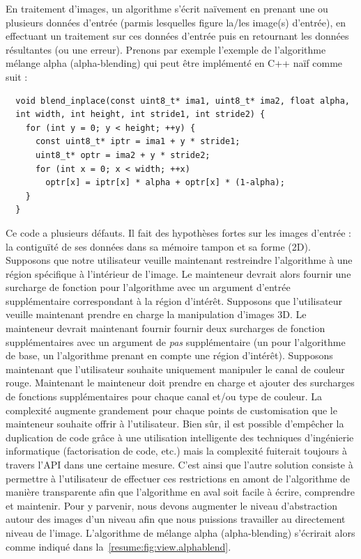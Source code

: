 En traitement d'images, un algorithme s'écrit naïvement en prenant une ou plusieurs données d'entrée (parmis lesquelles
figure la/les image(s) d'entrée), en effectuant un traitement sur ces données d'entrée puis en retournant les données
résultantes (ou une erreur). Prenons par exemple l'exemple de l'algorithme mélange alpha (alpha-blending) qui peut être
implémenté en C++ naïf comme suit :
\begin{verbatim}
  void blend_inplace(const uint8_t* ima1, uint8_t* ima2, float alpha,
  int width, int height, int stride1, int stride2) {
    for (int y = 0; y < height; ++y) {
      const uint8_t* iptr = ima1 + y * stride1;
      uint8_t* optr = ima2 + y * stride2;
      for (int x = 0; x < width; ++x)
        optr[x] = iptr[x] * alpha + optr[x] * (1-alpha);
    }
  }
\end{verbatim}

Ce code a plusieurs défauts. Il fait des hypothèses fortes sur les images d'entrée : la contiguïté de ses données dans
sa mémoire tampon et sa forme (2D). Supposons que notre utilisateur veuille maintenant restreindre l'algorithme à une
région spécifique à l'intérieur de l'image. Le mainteneur devrait alors fournir une surcharge de fonction pour
l'algorithme avec un argument d'entrée supplémentaire correspondant à la région d'intérêt. Supposons que l'utilisateur
veuille maintenant prendre en charge la manipulation d'images 3D. Le mainteneur devrait maintenant fournir fournir deux
surcharges de fonction supplémentaires avec un argument de \emph{pas} supplémentaire (un pour l'algorithme de base, un
l'algorithme prenant en compte une région d'intérêt). Supposons maintenant que l'utilisateur souhaite uniquement
manipuler le canal de couleur rouge. Maintenant le mainteneur doit prendre en charge et ajouter des surcharges de
fonctions supplémentaires pour chaque canal et/ou type de couleur. La complexité augmente grandement pour chaque points
de customisation que le mainteneur souhaite offrir à l'utilisateur. Bien sûr, il est possible d'empêcher la duplication
de code grâce à une utilisation intelligente des techniques d'ingénierie informatique (factorisation de code, etc.) mais
la complexité fuiterait toujours à travers l'API dans une certaine mesure. C'est ainsi que l'autre solution consiste à
permettre à l'utilisateur de effectuer ces restrictions en amont de l'algorithme de manière transparente afin que
l'algorithme en aval soit facile à écrire, comprendre et maintenir. Pour y parvenir, nous devons augmenter le niveau
d'abstraction autour des images d'un niveau afin que nous puissions travailler au directement niveau de l'image.
L'algorithme de mélange alpha (alpha-blending) s'écrirait alors comme indiqué dans la~\cref{resume:fig:view.alphablend}.

